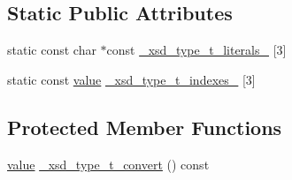 \subsection*{Static Public Attributes}
\begin{DoxyCompactItemize}
\item 
static const char $\ast$const \hyperlink{classtype__t_a705db5b354830eabddfc3cca4f622943}{\-\_\-xsd\-\_\-type\-\_\-t\-\_\-literals\-\_\-} \mbox{[}3\mbox{]}
\item 
static const \hyperlink{classtype__t_a2cd65d363cac2eb0d81f2e61f5b6bcff}{value} \hyperlink{classtype__t_a6d98249ea91d2df2401b34eb2f0adda2}{\-\_\-xsd\-\_\-type\-\_\-t\-\_\-indexes\-\_\-} \mbox{[}3\mbox{]}
\end{DoxyCompactItemize}
\subsection*{Protected Member Functions}
\begin{DoxyCompactItemize}
\item 
\hyperlink{classtype__t_a2cd65d363cac2eb0d81f2e61f5b6bcff}{value} \hyperlink{classtype__t_a13952c06b27bc7479c1bdc24cb1a9939}{\-\_\-xsd\-\_\-type\-\_\-t\-\_\-convert} () const 
\end{DoxyCompactItemize}


